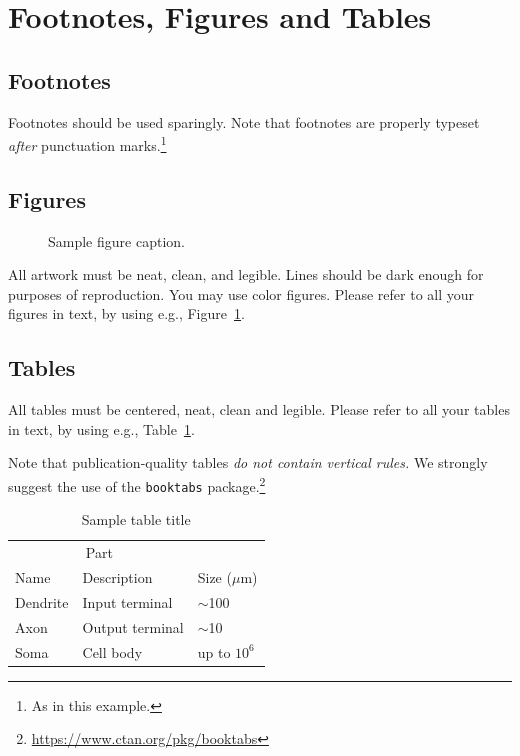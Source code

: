 \documentclass{article}
\begin{document}
\section{Footnotes, Figures and Tables}

\subsection{Footnotes}
Footnotes should be used sparingly. Note that footnotes are properly typeset \emph{after} punctuation marks.\footnote{As in this example.}


\subsection{Figures}


\begin{figure}
  \centering
  \fbox{\rule[-.5cm]{0cm}{4cm} \rule[-.5cm]{4cm}{0cm}}
  \caption{Sample figure caption.}
  \label{fig:example}
\end{figure}


All artwork must be neat, clean, and legible. Lines should be dark enough for
purposes of reproduction. You may use color figures. Please refer to all your figures in text, by using e.g., Figure~\ref{fig:example}. 

\subsection{Tables}
All tables must be centered, neat, clean and legible. Please refer to all your tables in text, by using e.g., Table~\ref{tab:example}.

Note that publication-quality tables \emph{do not contain vertical rules.} We
strongly suggest the use of the \verb+booktabs+ package.\footnote{\url{https://www.ctan.org/pkg/booktabs}}


\begin{table}
  \caption{Sample table title}
  \label{tab:example}
  \centering
  \begin{tabular}{lll}
    \toprule
    \multicolumn{2}{c}{Part}                   \\
    \cmidrule(r){1-2}
    Name     & Description     & Size ($\mu$m) \\
    \midrule
    Dendrite & Input terminal  & $\sim$100     \\
    Axon     & Output terminal & $\sim$10      \\
    Soma     & Cell body       & up to $10^6$  \\
    \bottomrule
  \end{tabular}
\end{table}
\end{document}
